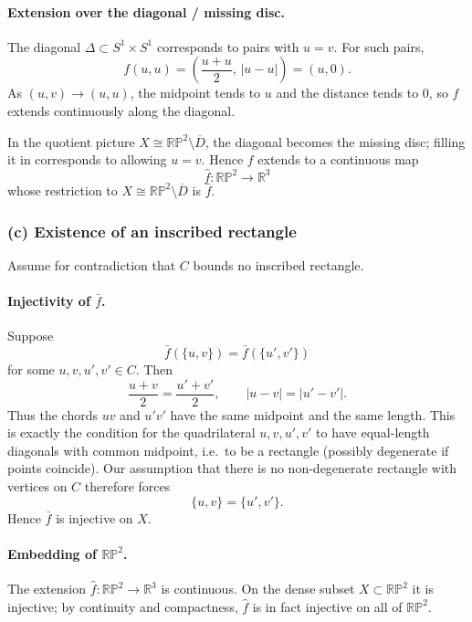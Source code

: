\documentclass[12pt,a4paper]{article}
\theoremstyle{plain}
\theoremstyle{definition}      %
\begin{document}
\paragraph{Extension over the diagonal / missing disc.}
The diagonal $\Delta\subset S^{1}\times S^{1}$ corresponds to pairs with
$u=v$.  For such pairs,
\[
f(u,u)
=\left(\frac{u+u}{2},\,|u-u|\right)
=(u,0).
\]
As $(u,v)\to(u,u)$, the midpoint tends to $u$ and the distance tends to $0$,
so $f$ extends continuously along the diagonal.

In the quotient picture $X\cong\mathbb{RP}^{2}\setminus\overline{D}$, the
diagonal becomes the missing disc; filling it in corresponds to allowing
$u=v$.  Hence $f$ extends to a continuous map
\[
\hat f:\mathbb{RP}^{2}\longrightarrow\mathbb{R}^{3}
\]
whose restriction to $X\cong\mathbb{RP}^{2}\setminus\overline{D}$ is $\bar f$.


\subsubsection*{(c) Existence of an inscribed rectangle}

Assume for contradiction that $C$ bounds no inscribed rectangle.

\paragraph{Injectivity of $\bar f$.}
Suppose
\[
\bar f(\{u,v\})=\bar f(\{u',v'\})
\]
for some $u,v,u',v'\in C$.  Then
\[
\frac{u+v}{2}=\frac{u'+v'}{2},\qquad
|u-v|=|u'-v'|.
\]
Thus the chords $uv$ and $u'v'$ have the same midpoint and the same length.
This is exactly the condition for the quadrilateral $u,v,u',v'$ to have
equal-length diagonals with common midpoint, i.e.\ to be a rectangle
(possibly degenerate if points coincide).  Our assumption that there is no
non-degenerate rectangle with vertices on $C$ therefore forces
\[
\{u,v\}=\{u',v'\}.
\]
Hence $\bar f$ is injective on $X$.

\paragraph{Embedding of $\mathbb{RP}^{2}$.}
The extension $\hat f:\mathbb{RP}^{2}\to\mathbb{R}^{3}$ is continuous.
On the dense subset $X\subset\mathbb{RP}^{2}$ it is injective; by continuity
and compactness, $\hat f$ is in fact injective on all of $\mathbb{RP}^{2}$.
\end{document}

